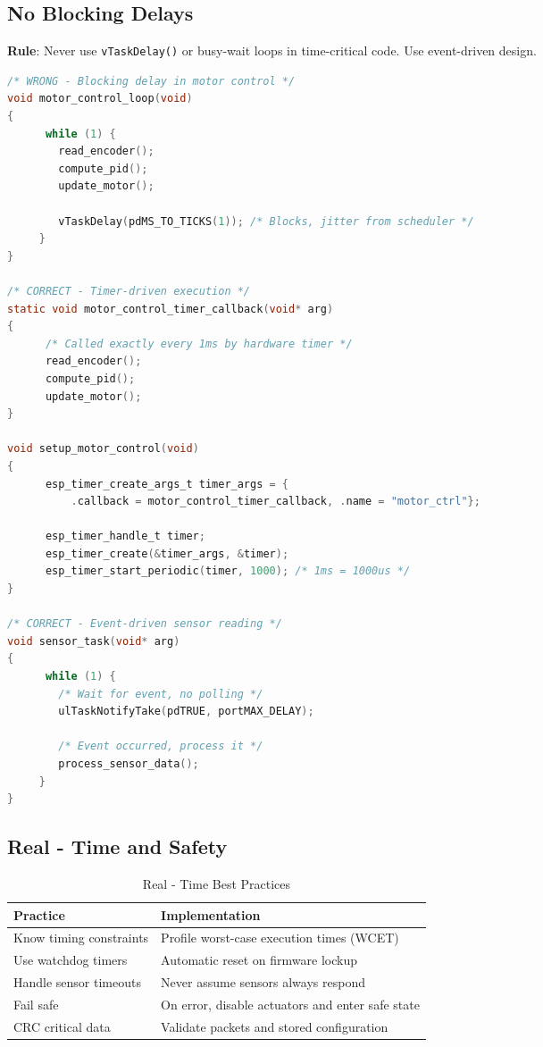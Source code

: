 \subsection{No Blocking Delays}

\textbf{Rule}: Never use \texttt{vTaskDelay()} or busy-wait loops in time-critical code. Use event-driven design.

\begin{lstlisting}[language=C]
/* WRONG - Blocking delay in motor control */
void motor_control_loop(void)
{
      while (1) {
        read_encoder();
        compute_pid();
        update_motor();

        vTaskDelay(pdMS_TO_TICKS(1)); /* Blocks, jitter from scheduler */
     }
}

/* CORRECT - Timer-driven execution */
static void motor_control_timer_callback(void* arg)
{
      /* Called exactly every 1ms by hardware timer */
      read_encoder();
      compute_pid();
      update_motor();
}

void setup_motor_control(void)
{
      esp_timer_create_args_t timer_args = {
          .callback = motor_control_timer_callback, .name = "motor_ctrl"};

      esp_timer_handle_t timer;
      esp_timer_create(&timer_args, &timer);
      esp_timer_start_periodic(timer, 1000); /* 1ms = 1000us */
}

/* CORRECT - Event-driven sensor reading */
void sensor_task(void* arg)
{
      while (1) {
        /* Wait for event, no polling */
        ulTaskNotifyTake(pdTRUE, portMAX_DELAY);

        /* Event occurred, process it */
        process_sensor_data();
     }
}


\end{lstlisting}
\subsection{Real - Time and Safety}

\begin{table}[H]
\centering
\caption{Real - Time Best Practices}
\label{tab:realtime-practices}
\begin{tabular}{
      | l | p{9cm} |}
\hline
\textbf{Practice} & \textbf{Implementation} \\
\hline
Know timing constraints & Profile worst-case execution times (WCET) \\
\hline
Use watchdog timers & Automatic reset on firmware lockup \\
\hline
Handle sensor timeouts & Never assume sensors always respond \\
\hline
Fail safe & On error, disable actuators and enter safe state \\
\hline
CRC critical data & Validate packets and stored configuration \\
\hline
\end{tabular}
\end{table}

